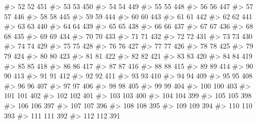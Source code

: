 \documentclass[
  letterpaper,
  DIV=11,
  numbers=noendperiod]{scrreprt}
\newenvironment{Shaded}{\begin{snugshade}}{\end{snugshade}}
\newcommand{\CommentTok}[1]{\textcolor[rgb]{0.37,0.37,0.37}{#1}}
\begin{document}
\begin{Shaded}
\begin{Highlighting}[]
\CommentTok{\#\textgreater{} 52   52  451}
\CommentTok{\#\textgreater{} 53   53  450}
\CommentTok{\#\textgreater{} 54   54  449}
\CommentTok{\#\textgreater{} 55   55  448}
\CommentTok{\#\textgreater{} 56   56  447}
\CommentTok{\#\textgreater{} 57   57  446}
\CommentTok{\#\textgreater{} 58   58  445}
\CommentTok{\#\textgreater{} 59   59  444}
\CommentTok{\#\textgreater{} 60   60  443}
\CommentTok{\#\textgreater{} 61   61  442}
\CommentTok{\#\textgreater{} 62   62  441}
\CommentTok{\#\textgreater{} 63   63  440}
\CommentTok{\#\textgreater{} 64   64  439}
\CommentTok{\#\textgreater{} 65   65  438}
\CommentTok{\#\textgreater{} 66   66  437}
\CommentTok{\#\textgreater{} 67   67  436}
\CommentTok{\#\textgreater{} 68   68  435}
\CommentTok{\#\textgreater{} 69   69  434}
\CommentTok{\#\textgreater{} 70   70  433}
\CommentTok{\#\textgreater{} 71   71  432}
\CommentTok{\#\textgreater{} 72   72  431}
\CommentTok{\#\textgreater{} 73   73  430}
\CommentTok{\#\textgreater{} 74   74  429}
\CommentTok{\#\textgreater{} 75   75  428}
\CommentTok{\#\textgreater{} 76   76  427}
\CommentTok{\#\textgreater{} 77   77  426}
\CommentTok{\#\textgreater{} 78   78  425}
\CommentTok{\#\textgreater{} 79   79  424}
\CommentTok{\#\textgreater{} 80   80  423}
\CommentTok{\#\textgreater{} 81   81  422}
\CommentTok{\#\textgreater{} 82   82  421}
\CommentTok{\#\textgreater{} 83   83  420}
\CommentTok{\#\textgreater{} 84   84  419}
\CommentTok{\#\textgreater{} 85   85  418}
\CommentTok{\#\textgreater{} 86   86  417}
\CommentTok{\#\textgreater{} 87   87  416}
\CommentTok{\#\textgreater{} 88   88  415}
\CommentTok{\#\textgreater{} 89   89  414}
\CommentTok{\#\textgreater{} 90   90  413}
\CommentTok{\#\textgreater{} 91   91  412}
\CommentTok{\#\textgreater{} 92   92  411}
\CommentTok{\#\textgreater{} 93   93  410}
\CommentTok{\#\textgreater{} 94   94  409}
\CommentTok{\#\textgreater{} 95   95  408}
\CommentTok{\#\textgreater{} 96   96  407}
\CommentTok{\#\textgreater{} 97   97  406}
\CommentTok{\#\textgreater{} 98   98  405}
\CommentTok{\#\textgreater{} 99   99  404}
\CommentTok{\#\textgreater{} 100 100  403}
\CommentTok{\#\textgreater{} 101 101  402}
\CommentTok{\#\textgreater{} 102 102  401}
\CommentTok{\#\textgreater{} 103 103  400}
\CommentTok{\#\textgreater{} 104 104  399}
\CommentTok{\#\textgreater{} 105 105  398}
\CommentTok{\#\textgreater{} 106 106  397}
\CommentTok{\#\textgreater{} 107 107  396}
\CommentTok{\#\textgreater{} 108 108  395}
\CommentTok{\#\textgreater{} 109 109  394}
\CommentTok{\#\textgreater{} 110 110  393}
\CommentTok{\#\textgreater{} 111 111  392}
\CommentTok{\#\textgreater{} 112 112  391}

\end{Highlighting}
\end{Shaded}
\end{document}
